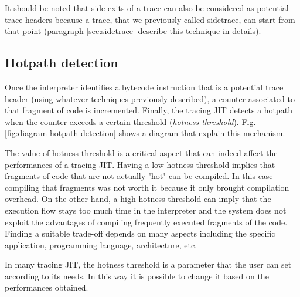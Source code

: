 \noindent
It should be noted that side exits of a trace can also be considered as potential trace headers because a trace, that we previously called sidetrace, can start from that point (paragraph \ref{sec:sidetrace} describe this technique in details).

\subsection{Hotpath detection}
\label{subsec:hotpath-detection}
Once the interpreter identifies a bytecode instruction that is a potential trace header (using whatever techniques previously described), a counter associated to that fragment of code is incremented. Finally, the tracing JIT detects a hotpath when the counter exceeds a certain threshold (\textit{hotness threshold}). Fig. \ref{fig:diagram-hotpath-detection} shows a diagram that explain this mechanism.

The value of hotness threshold is a critical aspect that can indeed affect the performances of a tracing JIT. Having a low hotness threshold implies that fragments of code that are not actually "hot" can be compiled. In this case compiling that fragments was not worth it because it only brought compilation overhead. On the other hand, a high hotness threshold can imply that the execution flow stays too much time in the interpreter and the system does not exploit the advantages of compiling frequently executed fragments of the code. Finding a suitable trade-off depends on many aspects including the specific application, programming language, architecture, etc.

In many tracing JIT, the hotness threshold is a parameter that the user can set according to its needs. In this way it is possible to change it based on the performances obtained.



